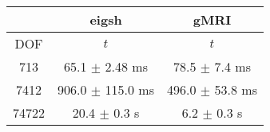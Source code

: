 \centering
\renewcommand{\arraystretch}{1.1}
\begin{tabular}{@{}c|c|c@{}}
    \toprule
     & eigsh & gMRI \\
    \midrule
    DOF & $t$ &  $t$ \\
    \midrule
    713 & 65.1 $\pm$ 2.48 ms & 78.5 $\pm$ 7.4 ms \\
    7412 & 906.0 $\pm$ 115.0 ms & 496.0 $\pm$ 53.8 ms \\
    74722 & 20.4 $\pm$ 0.3 s & 6.2 $\pm$ 0.3 s \\
    \bottomrule
\end{tabular}